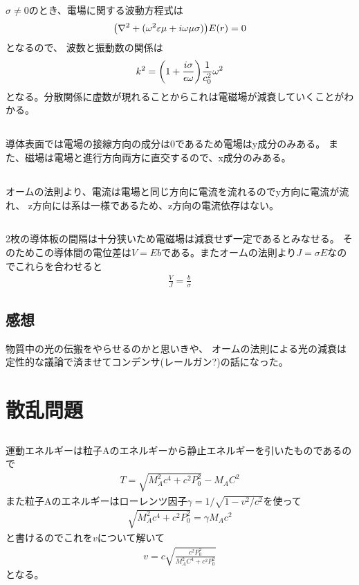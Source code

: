 \documentclass[../../master.tex]{subfiles}
\begin{document}
\(\sigma\neq0\)のとき、電場に関する波動方程式は
\begin{align}
    \qty(\nabla^2+(\omega^2\varepsilon\mu+i\omega\mu\sigma))E(r)=0
\end{align}
となるので、
波数と振動数の関係は
\begin{align}
    k^2 = \qty(1+\frac{i\sigma}{\epsilon\omega})\frac{1}{c_0^2} \omega^2
\end{align}
となる。分散関係に虚数が現れることからこれは電磁場が減衰していくことがわかる。

\subsection{}
導体表面では電場の接線方向の成分は0であるため電場はy成分のみある。
また、磁場は電場と進行方向両方に直交するので、x成分のみある。

\subsection{}
オームの法則より、電流は電場と同じ方向に電流を流れるのでy方向に電流が流れ、
z方向には系は一様であるため、z方向の電流依存はない。

\subsection{}
2枚の導体板の間隔は十分狭いため電磁場は減衰せず一定であるとみなせる。
そのためこの導体間の電位差は\(V = Eb\)である。またオームの法則より\(J=\sigma E\)なのでこれらを合わせると
\begin{align}
    \frac{V}{J} = \frac{b}{\sigma}
\end{align}
\subsection*{感想}
物質中の光の伝搬をやらせるのかと思いきや、
オームの法則による光の減衰は定性的な議論で済ませてコンデンサ(レールガン?)の話になった。

\section{散乱問題}
\subsection{}
運動エネルギーは粒子Aのエネルギーから静止エネルギーを引いたものであるので
\begin{align}
    T = \sqrt{M_A^2c^4+c^2P_0^2}-M_AC^2
\end{align}
また粒子Aのエネルギーはローレンツ因子\(\gamma=1/\sqrt{1-v^2/c^2}\)を使って
\begin{align}
    \sqrt{M_A^2c^4+c^2P_0^2} = \gamma M_Ac^2
\end{align}
と書けるのでこれを\(v\)について解いて
\begin{align}
    v = c \sqrt{\frac{c^2P_0^2}{M_A^2C^4+c^2P_0^2}}
\end{align}
となる。
\end{document}

